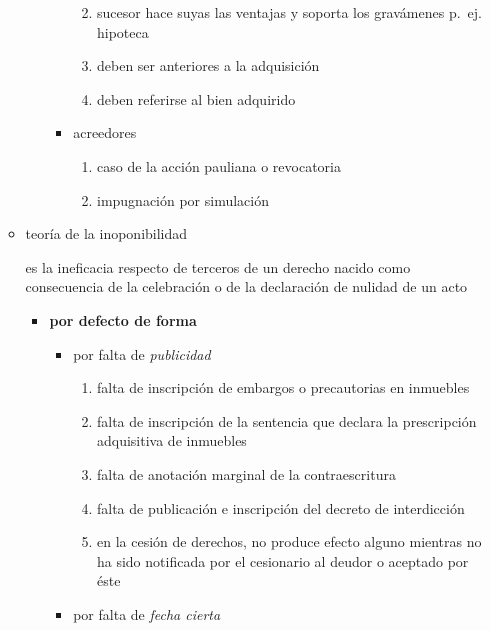 \documentclass[]{article}
\providecommand{\tightlist}{%
  \setlength{\itemsep}{0pt}\setlength{\parskip}{0pt}}
\begin{document}
\begin{itemize}
\begin{itemize}
\begin{itemize}
\begin{itemize}
        \begin{enumerate}
        \def\labelenumi{\arabic{enumi}.}
        \tightlist
        \item
          sucesor hace suyas las ventajas y soporta los gravámenes
          p.~ej. hipoteca
        \item
          deben ser anteriores a la adquisición
        \item
          deben referirse al bien adquirido
        \end{enumerate}
      \item
        acreedores

        \begin{enumerate}
        \def\labelenumi{\arabic{enumi}.}
        \tightlist
        \item
          caso de la acción pauliana o revocatoria
        \item
          impugnación por simulación
        \end{enumerate}
      \end{itemize}
    \end{itemize}
  \item
    teoría de la inoponibilidad

    es la ineficacia respecto de terceros de un derecho nacido como
    consecuencia de la celebración o de la declaración de nulidad de un
    acto

    \begin{itemize}
    \tightlist
    \item
      \textbf{por defecto de forma}

      \begin{itemize}
      \item
        por falta de \emph{publicidad}

        \begin{enumerate}
        \def\labelenumi{\arabic{enumi}.}
        \tightlist
        \item
          falta de inscripción de embargos o precautorias en inmuebles
        \item
          falta de inscripción de la sentencia que declara la
          prescripción adquisitiva de inmuebles
        \item
          falta de anotación marginal de la contraescritura
        \item
          falta de publicación e inscripción del decreto de interdicción
        \item
          en la cesión de derechos, no produce efecto alguno mientras no
          ha sido notificada por el cesionario al deudor o aceptado por
          éste
        \end{enumerate}
      \item
        por falta de \emph{fecha cierta}


\end{itemize}
\end{itemize}
\end{itemize}
\end{itemize}
\end{document}
